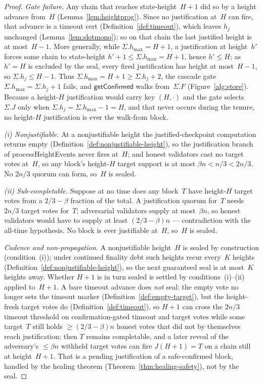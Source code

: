 \ifx\litemode\undefined\documentclass{article}\fi
\newcommand{\hmax}{\ensuremath{h_{\max}}\xspace}
\newcommand{\processHeightEvents}{\textsf{processHeightEvents}\xspace}
\newcommand{\getConfirmed}{\textsf{getConfirmed}\xspace}
\newcommand{\Knj}{\ensuremath{K}}                      %
\theoremstyle{plain}
\theoremstyle{definition}
\theoremstyle{remark}
\begin{document}
\begin{proof}
\emph{Gate failure.}
Any chain that reaches state-height~\(H+1\) did so by a height advance from~\(H\)
(Lemma~\ref{lem:heightprog}).
Since no justification at~\(H\) can fire, that advance is a timeout cert
(Definition~\ref{def:timeout}), which leaves \(h_j\) unchanged
(Lemma~\ref{lem:slotmono}); so on that chain the last justified height is at
most~\(H-1\).
More generally, while \(\Sigma.\hmax = H+1\), a justification at height~\(h'\)
forces some chain to state-height \(h'+1 \leq \Sigma.\hmax = H+1\), hence
\(h' \leq H\); as \(h' = H\) is excluded by the seal, every fired justification
has height at most~\(H-1\), so \(\Sigma.h_j \leq H-1\).
Thus \(\Sigma.\hmax = H+1 \geq \Sigma.h_j + 2\), the cascade gate
\(\Sigma.\hmax = \Sigma.h_j + 1\) fails, and \(\getConfirmed\) walks
from~\(\Sigma.F\) (Figure~\ref{alg:store}).
Because a height-\(H\) justification would carry key \((H,\cdot)\) and the gate
selects~\(\Sigma.J\) only when \(\Sigma.h_j = \Sigma.\hmax - 1 = H\), and that
never occurs during the tenure, no height-\(H\) justification is ever the
walk-from block.

\emph{(i) Nonjustifiable.}
At a nonjustifiable height the justified-checkpoint computation returns empty
(Definition~\ref{def:nonjustifiable-height}), so the justification branch of
\processHeightEvents never fires at~\(H\); and honest validators cast no target
votes at~\(H\), so any block's height-\(H\) target support is at most
\(\beta n < n/3 < 2n/3\).  No \(2n/3\) quorum can form, so~\(H\) is sealed.

\emph{(ii) Sub-completable.}
Suppose at no time does any block~\(T\) have height-\(H\) target votes from a
\(2/3 - \beta\) fraction of the total.
A justification quorum for~\(T\) needs \(2n/3\) target votes for~\(T\);
adversarial validators supply at most~\(\beta n\), so honest validators would
have to supply at least \((2/3 - \beta)n\) --- contradiction with the all-time
hypothesis.  No block is ever justifiable at~\(H\), so~\(H\) is sealed.

\emph{Cadence and non-propagation.}
A nonjustifiable height~\(H\) is sealed by construction (condition~(i)); under
continued finality debt such heights recur every~\(\Knj\) heights
(Definition~\ref{def:nonjustifiable-height}), so the next guaranteed seal is at
most~\(\Knj\) heights away.  Whether \(H+1\) is in turn sealed is settled by
conditions~(i)--(ii) applied to~\(H+1\).  A bare timeout advance does
\emph{not} seal: the empty vote no longer sets the timeout marker
(Definition~\ref{def:empty-target}), but the height-fresh target votes do
(Definition~\ref{def:timeout}), so \(H+1\) can cross the \(2n/3\) timeout
threshold on confirmation-gated timeout and target votes while some target~\(T\)
still holds \(\geq (2/3 - \beta)n\) honest votes that did not by themselves reach
justification; then \(T\) remains completable, and a later reveal of the
adversary's \(\leq \beta n\) withheld target votes can fire \(J(H+1) = T\) on a
chain still at height~\(H+1\).  That is a pending justification of a
safe-confirmed block, handled by the healing theorem
(Theorem~\ref{thm:healing-safety}), not by the seal.
\end{proof}
\end{document}
